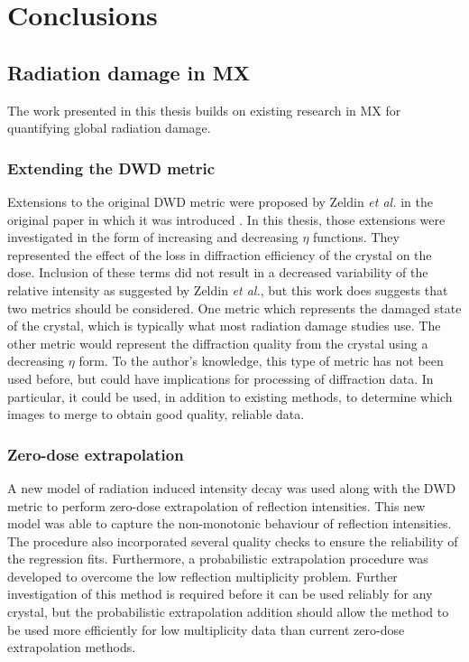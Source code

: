 \chapter{Conclusions}
\label{chap:Conclusions}

\section{Radiation damage in MX}
\label{sec:Radiation damage in MX}
The work presented in this thesis builds on existing research in MX for quantifying global radiation damage.

\subsection{Extending the DWD metric}
\label{sub:Extending the DWD metric}
Extensions to the original DWD metric were proposed by Zeldin \textit{et al.} in the original paper in which it was introduced \cite{zeldin2013dwd}.
In this thesis, those extensions were investigated in the form of increasing and decreasing $\eta$ functions.
They represented the effect of the loss in diffraction efficiency of the crystal on the dose.
Inclusion of these terms did not result in a decreased variability of the relative intensity as suggested by Zeldin \textit{et al.}, but this work does suggests that two metrics should be considered.
One metric which represents the damaged state of the crystal, which is typically what most radiation damage studies use.
The other metric would represent the diffraction quality from the crystal using a decreasing $\eta$ form.
To the author's knowledge, this type of metric has not been used before, but could have implications for processing of diffraction data.
In particular, it could be used, in addition to existing methods, to determine which images to merge to obtain good quality, reliable data.

\subsection{Zero-dose extrapolation}
\label{sub:Zero-dose extrapolation}
A new model of radiation induced intensity decay was used along with the DWD metric to perform zero-dose extrapolation of reflection intensities.
This new model was able to capture the non-monotonic behaviour of reflection intensities.
The procedure also incorporated several quality checks to ensure the reliability of the regression fits.
Furthermore, a probabilistic extrapolation procedure was developed to overcome the low reflection multiplicity problem.
Further investigation of this method is required before it can be used reliably for any crystal, but the probabilistic extrapolation addition should allow the method to be used more efficiently for low multiplicity data than current zero-dose extrapolation methods.

